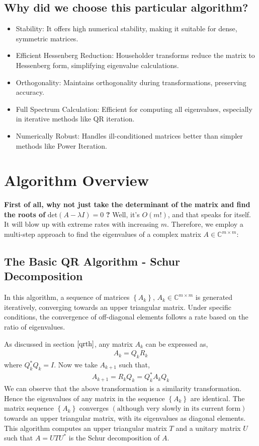 \documentclass[12pt]{article}
\numberwithin{equation}{section}
\newcommand{\brak}[1]{\ensuremath{\left(#1\right)}}
\newcommand{\cbrak}[1]{\ensuremath{\left\{#1\right\}}}
\newcommand{\defmat}[2]{#1\in\mathbb{C}^{#2\times#2}}
\begin{document}
\subsection{Why did we choose this particular algorithm?}
\begin{itemize}
\item Stability: It offers high numerical stability, making it suitable for dense, symmetric matrices.
\item Efficient Hessenberg Reduction: Householder transforms reduce the matrix to Hessenberg form, simplifying eigenvalue calculations.
\item Orthogonality: Maintains orthogonality during transformations, preserving accuracy.
\item Full Spectrum Calculation: Efficient for computing all eigenvalues, especially in iterative methods like QR iteration.
\item Numerically Robust: Handles ill-conditioned matrices better than simpler methods like Power Iteration.
\end{itemize}

\section{Algorithm Overview}
\textbf{First of all, why not just take the determinant of the matrix and find the roots of} $\text{det}\brak{A - \lambda I} = 0$ \textbf{?}
\newline
Well, it's $O\brak{m!}$, and that speaks for itself. It will blow up with extreme rates with increasing $m$.
\newline
Therefore, we employ a multi-step approach to find the eigenvalues of a complex matrix $\defmat{A}{m}$:

\subsection{The Basic QR Algorithm - Schur Decomposition}
In this algorithm, a sequence of matrices $\cbrak{A_k}$, $\defmat{A_k}{m}$ is generated iteratively, converging towards an upper triangular matrix. Under specific conditions, the convergence of off-diagonal elements follows a rate based on the ratio of eigenvalues.

As discussed in section $\ref{qrth}$, any matrix $A_k$ can be expressed as,
\begin{align}
    A_k = Q_k R_k
\end{align}
where $Q_k^{\ast}Q_k = I$.
\newline
Now we take $A_{k+1}$ such that,
\begin{align}
    A_{k + 1} = R_k Q_k = Q_k^{\ast} A_k Q_k
\end{align}
We can observe that the above transformation is a similarity transformation. Hence the eigenvalues of any matrix in the sequence $\cbrak{A_k}$ are identical.
\newline
The matrix sequence $\cbrak{A_k}$ converges \brak{\text{although very slowly in its current form}} towards an upper triangular matrix, with its eigenvalues as diagonal elements.
This algorithm computes an upper triangular matrix $T$ and a unitary matrix $U$ such that $A = UTU^{\ast}$ is the Schur decomposition of $A$.
\end{document}
